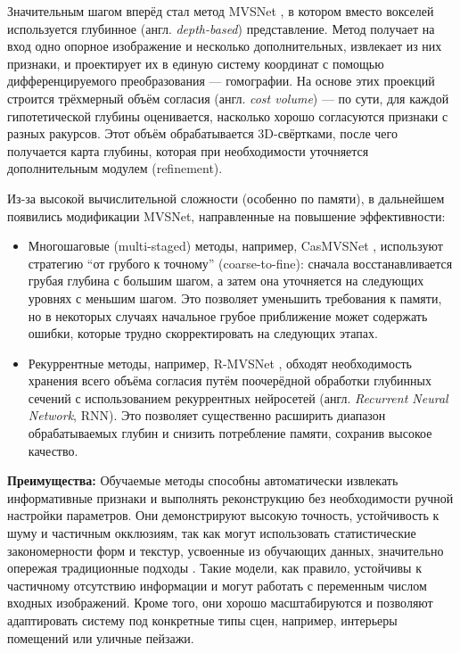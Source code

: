 Значительным шагом вперёд стал метод MVSNet
\cite{yao2018mvsnetdepthinferenceunstructured}, в котором вместо вокселей
используется глубинное (англ. \emph{depth-based}) представление. Метод получает на вход одно
опорное изображение и несколько дополнительных, извлекает из них признаки, и
проектирует их в единую систему координат с помощью дифференцируемого
преобразования — гомографии. На основе этих проекций строится трёхмерный
объём согласия (англ. \emph{cost volume}) — по сути, для каждой гипотетической глубины
оценивается, насколько хорошо согласуются признаки с разных ракурсов. Этот объём
обрабатывается 3D-свёртками, после чего получается карта глубины, которая при
необходимости уточняется дополнительным модулем (refinement).

Из-за высокой вычислительной сложности (особенно по памяти), в дальнейшем
появились модификации MVSNet, направленные на повышение эффективности:

\begin{itemize}
	\item Многошаговые (multi-staged) методы, например, CasMVSNet
	\cite{gu2020cascadecostvolumehighresolution}, используют стратегию ``от
	грубого к точному'' (coarse-to-fine): сначала восстанавливается грубая глубина
	с большим шагом, а затем она уточняется на следующих уровнях с меньшим шагом.
	Это позволяет уменьшить требования к памяти, но в некоторых случаях начальное
	грубое приближение может содержать ошибки, которые трудно скорректировать на
	следующих этапах.
	\item Рекуррентные методы, например, R-MVSNet
	\cite{yao2019recurrentmvsnethighresolutionmultiview}, обходят необходимость
	хранения всего объёма согласия путём поочерёдной обработки глубинных сечений с
	использованием рекуррентных нейросетей (англ. \emph{Recurrent Neural Network}, RNN).
	Это позволяет существенно расширить диапазон обрабатываемых глубин и снизить
	потребление памяти, сохранив высокое качество.
\end{itemize}

\textbf{Преимущества:}
Обучаемые методы способны автоматически извлекать информативные признаки и
выполнять реконструкцию без необходимости ручной настройки параметров. Они
демонстрируют высокую точность, устойчивость к шуму и частичным окклюзиям, так
как могут использовать статистические закономерности форм и текстур, усвоенные
из обучающих данных, значительно опережая традиционные подходы
\cite{10.1109/CVPR.2017.272}. Такие модели, как правило, устойчивы к
частичному отсутствию информации и могут работать с переменным числом входных
изображений. Кроме того, они хорошо масштабируются и позволяют адаптировать
систему под конкретные типы сцен, например, интерьеры помещений или уличные
пейзажи.

